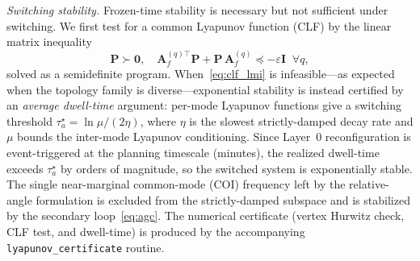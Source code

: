 \documentclass[lettersize,journal]{IEEEtran}
\begin{document}
\emph{Switching stability.} Frozen-time stability is necessary but
not sufficient under switching. We first test for a common
Lyapunov function (CLF) by the linear matrix inequality
\begin{equation}
\mathbf{P}\succ\mathbf 0,\quad
\mathbf{A}_f^{(q)\top}\mathbf{P}+\mathbf{P}\,\mathbf{A}_f^{(q)}
\preceq-\varepsilon\mathbf{I}\;\;\forall q,
\label{eq:clf_lmi}
\end{equation}
solved as a semidefinite program. When~\eqref{eq:clf_lmi} is
infeasible---as expected when the topology family is
diverse---exponential stability is instead certified by an
\emph{average dwell-time} argument: per-mode Lyapunov functions
give a switching threshold
$\tau_a^{\star}=\ln\mu/(2\eta)$, where $\eta$ is the slowest
strictly-damped decay rate and $\mu$ bounds the inter-mode
Lyapunov conditioning. Since Layer~0 reconfiguration is
event-triggered at the planning timescale (minutes), the realized
dwell-time exceeds $\tau_a^{\star}$ by orders of magnitude, so the
switched system is exponentially stable. The single near-marginal
common-mode (COI) frequency left by the relative-angle formulation
is excluded from the strictly-damped subspace and is stabilized by
the secondary loop~\eqref{eq:agc}. The numerical certificate
(vertex Hurwitz check, CLF test, and dwell-time) is produced by the
accompanying \texttt{lyapunov\_certificate} routine.







\end{document}
